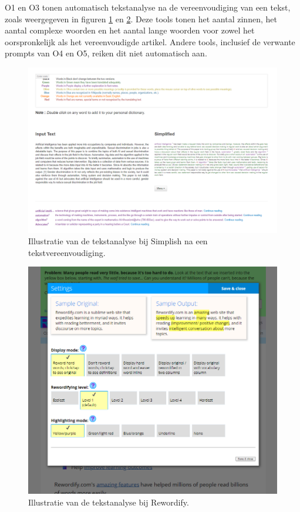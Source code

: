 O1 en O3 tonen automatisch tekstanalyse na de vereenvoudiging van een tekst, zoals weergegeven in figuren \ref{img:simplish-output} en \ref{img:scholarcy}. Deze tools tonen het aantal zinnen, het aantal complexe woorden en het aantal lange woorden voor zowel het oorspronkelijk als het vereenvoudigde artikel. Andere tools, inclusief de verwante prompts van O4 en O5, reiken dit niet automatisch aan. 

\begin{figure}[H]
	\includegraphics[width=\linewidth]{img/simplish-output.png}
	\caption{Illustratie van de tekstanalyse bij Simplish na een tekstvereenvoudiging.}
	\label{img:simplish-output}
\end{figure}

\begin{figure}[H]
	\includegraphics[width=\linewidth]{img/scholarcy-attempt.png}
	\caption{Illustratie van de tekstanalyse bij Rewordify.}
	\label{img:scholarcy}
\end{figure}

